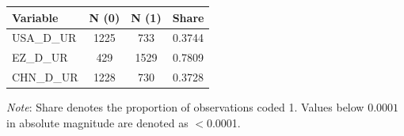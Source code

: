 \begin{tabular}{lccc}
  \toprule
  \textbf{Variable} & \textbf{N (0)} & \textbf{N (1)} & \textbf{Share} \\ 
  \midrule
  USA\_D\_UR & 1225 & 733 & 0.3744 \\ 
  EZ\_D\_UR & 429 & 1529 & 0.7809 \\ 
  CHN\_D\_UR & 1228 & 730 & 0.3728 \\ 
  \bottomrule
\end{tabular}
\par\vspace{4pt}
\begin{minipage}{\linewidth}
  \footnotesize \textit{Note}: Share denotes the proportion of observations coded 1. Values below $0.0001$ in absolute magnitude are denoted as $<$0.0001.
\end{minipage}